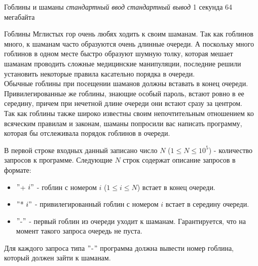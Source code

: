 \begin{problem}%
{Гоблины и шаманы}%
{\textsl{стандартный ввод}}%
{\textsl{стандартный вывод}}%
{1 секунда}%
{64 мегабайта}%
{}

Гоблины Мглистых гор очень любях ходить к своим шаманам. Так как гоблинов много, к шаманам часто образуются очень длинные очереди. А поскольку много гоблинов в одном месте быстро образуют шумную толку, которая мешает шаманам проводить сложные медицинские манипуляции, последние решили установить некоторые правила касательно порядка в очереди.\\

Обычные гоблины при посещении шаманов должны вставать в конец очереди. Привилегированные же гоблины, знающие особый пароль, встают ровно в ее середину, причем при нечетной длине очереди они встают сразу за центром.\\

Так как гоблины также широко известны своим непочтительным отношением ко всяческим правилам и законам, шаманы попросили вас написать программу, которая бы отслеживала порядок гоблинов в очереди.

\InputFile

В первой строке входных данный записано число $N$ ($1 \le N \le 10^5$) - количество запросов к программе. Следующие $N$ строк содержат описание запросов в формате:

\begin{itemize}
\item $"$+ $i"$ - гоблин с номером $i$ ($1 \le i \le N$) встает в конец очереди.
\item $"$* $i"$ - привилегированный гоблин с номером $i$ встает в середину очереди.
\item $"$-$"$ - первый гоблин из очереди уходит к шаманам. Гарантируется, что на момент такого запроса очередь не пуста.
\end{itemize}

\OutputFile

Для каждого запроса типа $"$-$"$ программа должна вывести номер гоблина, который должен зайти к шаманам.

\Examples

\begin{example}
%
\end{example}
\end{problem}
